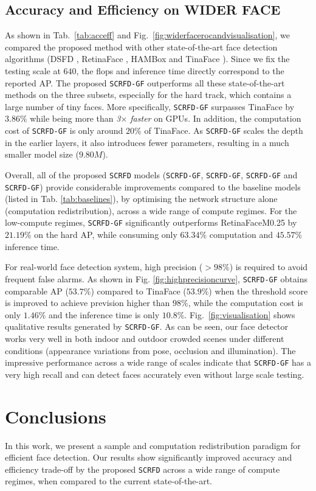 \documentclass[10pt,twocolumn,letterpaper]{article}
\newcommand{\dsname}[1]{\texttt{\small #1}\xspace}
\newcommand{\scrfd}{\dsname{SCRFD}}
\newcommand{\scrfdf}[1]{\dsname{SCRFD-\text{#1}GF}}
\begin{document}
\subsection{Accuracy and Efficiency on WIDER FACE}
As shown in Tab.~\ref{tab:acceff} and Fig.~\ref{fig:widerfacerocandvisualisation}, we compared the proposed method with other state-of-the-art face detection algorithms (\eg DSFD \cite{li2019dsfd}, RetinaFace \cite{deng2019retinaface}, HAMBox \cite{liu2019hambox} and TinaFace \cite{zhu2020tinaface}). Since we fix the testing scale at $640$, the flops and inference time directly correspond to the reported AP. The proposed \scrfdf{34} outperforms all these state-of-the-art methods on the three subsets, especially for the hard track, which contains a large number of tiny faces. More specifically, \scrfdf{34} surpasses TinaFace by $3.86\%$ while being more than \emph{3$\times$ faster} on GPUs. In addition, the computation cost of \scrfdf{34} is only around $20\%$ of TinaFace. As \scrfdf{34} scales the depth in the earlier layers, it also introduces fewer parameters, resulting in a much smaller model size ($9.80M$). 

Overall, all of the proposed \scrfd models (\eg \scrfdf{34}, \scrfdf{10}, \scrfdf{2.5} and \scrfdf{0.5}) provide considerable improvements compared to the baseline models (listed in Tab. \ref{tab:baselines}), by optimising the network structure alone (\ie computation redistribution), across a wide range of compute regimes. For the low-compute regimes, \scrfdf{0.5} significantly outperforms RetinaFaceM0.25 by $21.19\%$ on the hard AP, while consuming only $63.34\%$ computation and $45.57\%$ inference time. 

For real-world face detection system, high precision (\eg $>98\%$) is required to avoid frequent false alarms. As shown in Fig. \ref{fig:highprecisioncurve},
\scrfdf{2.5} obtains comparable AP ($53.7\%$) compared to TinaFace ($53.9\%$) when the threshold score is improved to achieve prevision higher than $98\%$, while the computation cost is only $1.46\%$ and the inference time is only $10.8\%$. Fig.~\ref{fig:visualisation} shows qualitative results generated by \scrfdf{2.5}. As can be seen, our face detector works very well in both indoor and outdoor crowded scenes under different conditions (\eg appearance variations from pose, occlusion and illumination). The impressive performance across a wide range of scales indicate that \scrfdf{2.5} has a very high recall and can detect faces accurately even without large scale testing.

\section{Conclusions}

In this work, we present a sample and computation redistribution paradigm for efficient face detection. Our results show significantly improved accuracy and efficiency trade-off by the proposed \scrfd across a wide range of compute regimes, when compared to the current state-of-the-art.

{\small


}
\end{document}
